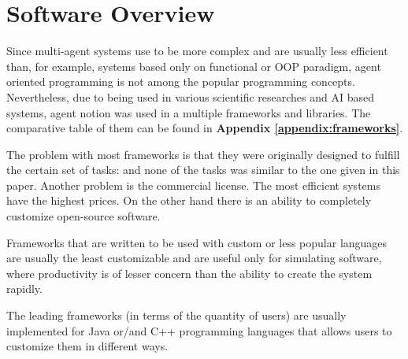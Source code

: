 \section{Software Overview}
Since multi-agent systems use to be more complex and are usually less efficient than, for example, systems based only on functional or OOP paradigm, agent oriented programming is not among the popular programming concepts. Nevertheless, due to being used in various scientific researches and AI based systems, agent notion was used in a multiple frameworks and libraries. The comparative table of them can be found in
\textbf{Appendix \ref{appendix:frameworks}}.

The problem with most frameworks is that they were originally designed to fulfill the certain set of tasks: and none of the tasks was similar to the one given in this paper.
Another problem is the commercial license. The most efficient systems have the highest prices. On the other hand there is an ability to completely customize open-source software.

Frameworks that are written to be used with custom or less popular languages are usually the least customizable and are useful only for simulating software, where productivity is of lesser concern than the ability to create the system rapidly.

The leading frameworks (in terms of the quantity of users) are usually implemented for Java or/and C++ programming languages that allows users to customize them in different ways.

